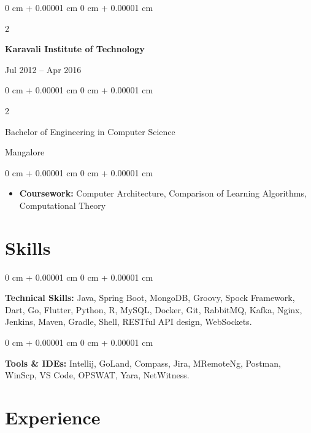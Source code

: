 \documentclass[10pt, letterpaper]{article}
\newenvironment{highlights}{
    \begin{itemize}[
        topsep=0.10 cm,
        parsep=0.10 cm,
        partopsep=0pt,
        itemsep=0pt,
        leftmargin=0 cm + 10pt
    ]
}{
    \end{itemize}
} %
\newenvironment{onecolentry}{
    \begin{adjustwidth}{
        0 cm + 0.00001 cm
    }{
        0 cm + 0.00001 cm
    }
}{
    \end{adjustwidth}
} %
\newenvironment{twocolentry}[2][]{
    \onecolentry
    \def\secondColumn{#2}
    \setcolumnwidth{\fill, 4.5 cm}
    \begin{paracol}{2}
}{
    \switchcolumn \raggedleft \secondColumn
    \end{paracol}
    \endonecolentry
} %
\begin{document}
        \begin{twocolentry}{Jul 2012 – Apr 2016}
            \textbf{Karavali Institute of Technology}
        \end{twocolentry}
        \begin{twocolentry}{Mangalore}
            Bachelor of Engineering in Computer Science
        \end{twocolentry}
        \begin{onecolentry}
            \begin{highlights}
                \item \textbf{Coursework:} Computer Architecture, Comparison of Learning Algorithms, Computational Theory
            \end{highlights}
        \end{onecolentry}

    \section{Skills}
        
        \begin{onecolentry}
            \textbf{Technical Skills:} Java, Spring Boot, MongoDB, Groovy, Spock Framework, Dart,  Go, Flutter, Python, R, MySQL, Docker, Git, RabbitMQ, Kafka, Nginx, Jenkins, Maven, Gradle, Shell, RESTful API design, WebSockets. \end{onecolentry}

        \vspace{0.2 cm}

        \begin{onecolentry}
            \textbf{Tools \& IDEs:} Intellij, GoLand, Compass, Jira, MRemoteNg, Postman, WinScp, VS Code, OPSWAT, Yara, NetWitness.
        \end{onecolentry}
   


        
    \section{Experience}
\end{document}
